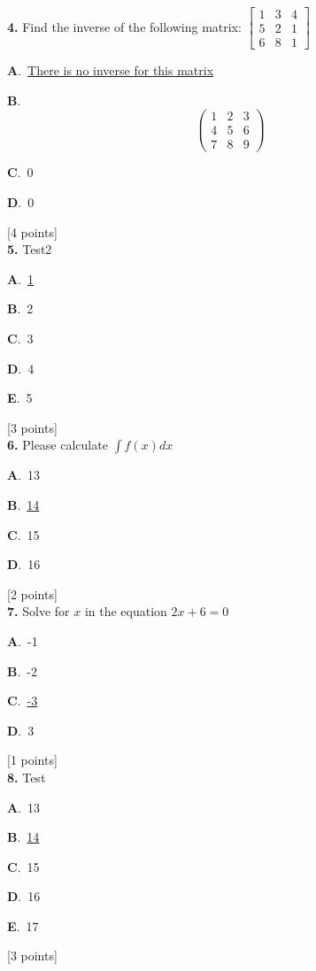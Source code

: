 \documentclass[12pt]{article}
\newcommand{\choice}[3]{%
  \noindent\textbf{#1}.~#2\hfill#3\par\vspace{0.25em}
}
\begin{document}
\noindent \textbf{\textenglish{4.}} {\textenglish{Find the inverse of the following matrix: }}\(\begin{bmatrix} 1 & 3 & 4 \\ 5 & 2 & 1 \\ 6 & 8 & 1 \end{bmatrix}\)

\noindent\choice{A}{\underline{{\textenglish{There is no inverse for this matrix}}}}{}
\noindent\choice{B}{\[\begin{pmatrix} 1 & 2 & 3 \\ 4 & 5 & 6 \\ 7 & 8 & 9  \end{pmatrix}\]}{}
\noindent\choice{C}{{\textenglish{0}}}{}
\noindent\choice{D}{{\textenglish{0}}}{}
\hfill {\textenglish{[4 points]}}\\[0.5em]

\noindent \textbf{\textenglish{5.}} {\textenglish{Test2}}

\noindent\choice{A}{\underline{{\textenglish{1}}}}{}
\noindent\choice{B}{{\textenglish{2}}}{}
\noindent\choice{C}{{\textenglish{3}}}{}
\noindent\choice{D}{{\textenglish{4}}}{}
\noindent\choice{E}{{\textenglish{5}}}{}
\hfill {\textenglish{[3 points]}}\\[0.5em]

\noindent \textbf{\textenglish{6.}} {\textenglish{Please calculate }}\(\int f(x)dx\)

\noindent\choice{A}{{\textenglish{13}}}{}
\noindent\choice{B}{\underline{{\textenglish{14}}}}{}
\noindent\choice{C}{{\textenglish{15}}}{}
\noindent\choice{D}{{\textenglish{16}}}{}
\hfill {\textenglish{[2 points]}}\\[0.5em]

\noindent \textbf{\textenglish{7.}} {\textenglish{Solve for }}\(x \){\textenglish{ in the equation }}\(2x+6 = 0 \)

\noindent\choice{A}{{\textenglish{-1}}}{}
\noindent\choice{B}{{\textenglish{-2}}}{}
\noindent\choice{C}{\underline{{\textenglish{-3}}}}{}
\noindent\choice{D}{{\textenglish{3}}}{}
\hfill {\textenglish{[1 points]}}\\[0.5em]

\noindent \textbf{\textenglish{8.}} {\textenglish{Test}}

\noindent\choice{A}{{\textenglish{13}}}{}
\noindent\choice{B}{\underline{{\textenglish{14}}}}{}
\noindent\choice{C}{{\textenglish{15}}}{}
\noindent\choice{D}{{\textenglish{16}}}{}
\noindent\choice{E}{{\textenglish{17}}}{}
\hfill {\textenglish{[3 points]}}\\[0.5em]
\end{document}
